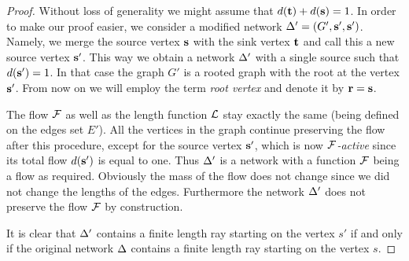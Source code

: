 \documentclass[12pt]{amsart}
\begin{document}
    \begin{proof}
      Without loss of generality we might assume that $d(\mathbf{t}) + d(\mathbf{s}) = 1$.
      In order to make our proof easier, we consider a modified network $\Delta' = (G', \mathbf{s}', \mathbf{s}')$.
      Namely, we merge the source vertex $\mathbf{s}$ with the sink vertex $\mathbf{t}$ and call this a new source vertex $\mathbf{s}'$.
      This way we obtain a network $\Delta'$ with a single source such that $d(\mathbf{s}') = 1$.
      In that case the graph $G'$ is a rooted graph with the root at the vertex $\mathbf{s}'$.
      From now on we will employ the term \emph{root vertex} and denote it by $\mathbf{r} = \mathbf{s}$.

      The flow $\mathcal{F}$ as well as the length function $\mathcal{L}$ stay exactly the same (being defined on the edges set $E'$).
      All the vertices in the graph continue preserving the flow after this procedure, except for the source vertex $\mathbf{s}'$,
        which is now \emph{$\mathcal{F}$-active} since its total flow $d(\mathbf{s}')$ is equal to one.
      Thus $\Delta'$ is a network with a function $\mathcal{F}$ being a flow as required.
      Obviously the mass of the flow does not change since we did not change the lengths of the edges.
      Furthermore the network $\Delta'$ does not preserve the flow $\mathcal{F}$ by construction.

      It is clear that $\Delta'$ contains a finite length ray starting on the vertex $s'$ if and only if the original network $\Delta$ contains a finite
        length ray starting on the vertex $s$.


\end{proof}
\end{document}
